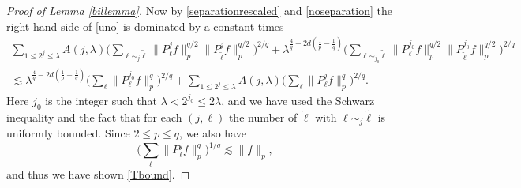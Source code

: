 \documentclass[11pt]{amsart}
\theoremstyle{definition}
\numberwithin{theorem}{section}
\numberwithin{definition}{section}
\numberwithin{equation}{section}
\def\tell{{\tilde \ell}}
\renewcommand{\le}{\leqslant}
\def\lc{\lesssim}
\def\la{\lambda}             \def\La{\Lambda}
\renewcommand{\le}{\leqslant}
\begin{document}
\begin{proof}[Proof of Lemma \ref{billemma}]
Now by \eqref{separationrescaled} and \eqref{noseparation} the right
hand side of \eqref{uno} is dominated by a constant times
\begin{align*}
 \sum_{1\le 2^{j}\le \la} A(j,\la) \Big(\sum_{{\ell}\sim_j{\tell}}\|
P_{\ell}^jf\|_p^{q/2}\|P_{\tell}^{j}f\|^{q/2}_{p}\Big)^{2/q}+\la^{\frac{4}{q}-2d(\frac{1}{p}-\frac{1}{q})}\Big(\sum_{{\ell}\sim_{j_0}{\tell}}\|
P_{\ell}^{j_0}f\|_p^{q/2}\|P_{\tell}^{j_0}f\|^{q/2}_{p}\Big)^{2/q}\\\lc
\la^{\frac{4}{q}-2d(\frac{1}{p}-\frac{1}{q})}\Big(\sum_{\ell}\|
P_{\ell}^{j_0}f\|_p^{q}\Big)^{2/q}+\sum_{1\le 2^{j}\le \la}
A(j,\la) \Big(\sum_{\ell}\| P_{\ell}^jf\|_p^{q}\Big)^{2/q}.
\end{align*}
Here $j_0$ is the integer such that $\la<2^{j_0}\le 2\la$, and  we have
used the Schwarz inequality and the fact that for each $(j,\ell)$
the number of $\tell$ with $\ell\sim_j\tell$ is uniformly bounded.
Since $2\le p\le q$, we also have
$$\Big(\sum_{\ell}\| P_{\ell}^jf\|_p^{q}\Big)^{1/q}\lc \|f\|_p,$$
and thus we have shown \eqref{Tbound}.
\end{proof}
\end{document}
